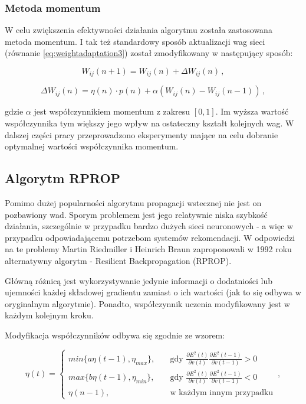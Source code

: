 \documentclass[twoside]{iisthesis}
\begin{document}
		 \subsubsection{Metoda momentum}
		 \label{sss:metoda_momentum}
	 
		 W celu zwiększenia efektywności działania algorytmu została zastosowana metoda momentum. I tak też standardowy sposób aktualizacji wag sieci (równanie \ref{eq:weightadaptation3}) został zmodyfikowany w następujący sposób:
		 
		 \begin{equation}
		 \label{eq:zasadamomentum1}
		 W_{ij}(n+1) = W_{ij}(n) + \Delta W_{ij}(n) 
		 \,,
		 \end{equation}
		 
		 \begin{equation}
		 \label{eq:zasadamomentum2}
		 \Delta W_{ij}(n) = \eta(n) \cdot p(n) + \alpha(W_{ij}(n)-W_{ij}(n-1)) 
		 \,,
		 \end{equation}
		 
		 gdzie $\alpha$ jest współczynnikiem momentum z zakresu $[0,1]$. Im wyższa wartość współczynnika tym większy jego wpływ na ostateczny kształt kolejnych wag. W dalszej części pracy przeprowadzono eksperymenty mające na celu dobranie optymalnej wartości współczynnika momentum.
		 
 		 \subsection{Algorytm RPROP}		 
		 
		 Pomimo dużej popularności algorytmu propagacji wstecznej nie jest on pozbawiony wad. Sporym problemem jest jego relatywnie niska szybkość działania, szczególnie w przypadku bardzo dużych sieci neuronowych - a więc w przypadku odpowiadającemu potrzebom systemów rekomendacji. W odpowiedzi na te problemy Martin Riedmiller i Heinrich Braun zaproponowali w 1992 roku alternatywny algorytm - Resilient Backpropagation (RPROP).
		 
		 Główną różnicą jest wykorzystywanie jedynie informacji o dodatniości lub ujemności każdej składowej gradientu zamiast o ich wartości (jak to się odbywa w oryginalnym algorytmie). Ponadto, współczynnik uczenia modyfikowany jest w każdym kolejnym kroku. 
		 
		 Modyfikacja współczynników odbywa się zgodnie ze wzorem:
		 
		 \begin{equation}
		 \label{eq:rprop}		 
		 \eta(t) = 
		 \begin{cases}
			min\{a \eta(t-1), \eta_{max}\}, & \quad \text{gdy } \frac{\partial E^2(t)}{\partial v(t)} \frac{\partial E^2(t-1)}{\partial v(t-1)} > 0 \\
			max\{b \eta(t-1), \eta_{min}\}, & \quad \text{gdy } \frac{\partial E^2(t)}{\partial v(t)} \frac{\partial E^2(t-1)}{\partial v(t-1)} < 0 \\
			\eta(n-1), & \quad \text{w każdym innym przypadku} 
		 \end{cases}		 
		 \,,
		 \end{equation}
		 
\end{document}
